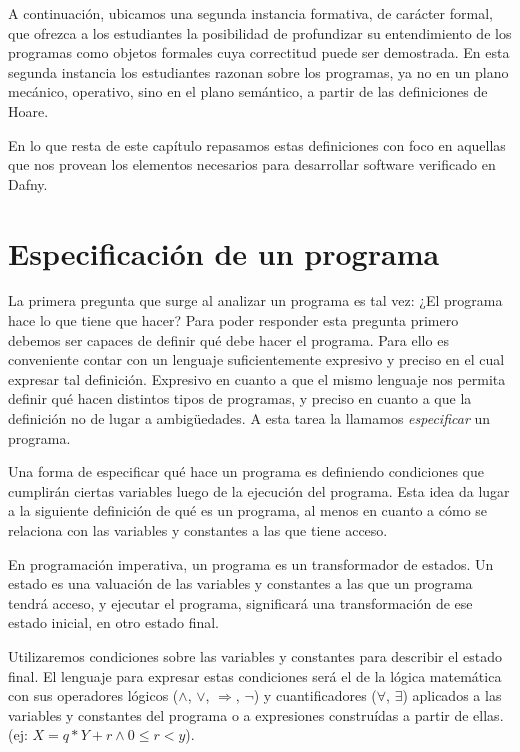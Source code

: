 \documentclass[12pt, a4paper, openany, fleqn]{book}
\begin{document}
    A continuación, ubicamos una segunda instancia formativa, de carácter formal, que ofrezca a los estudiantes la posibilidad de profundizar su entendimiento de los programas como objetos formales cuya correctitud puede ser demostrada.
    En esta segunda instancia los estudiantes razonan sobre los programas, ya no en un plano mecánico, operativo, sino en el plano semántico, a partir de las definiciones de Hoare.

    En lo que resta de este capítulo repasamos estas definiciones con foco en aquellas que nos provean los elementos necesarios para desarrollar software verificado en Dafny.

    \section{Especificación de un programa}
    La primera pregunta que surge al analizar un programa es tal vez: ¿El programa hace lo que tiene que hacer? Para poder responder esta pregunta primero debemos ser capaces de definir qué debe hacer el programa. Para ello es conveniente contar con un lenguaje suficientemente expresivo y preciso en el cual expresar tal definición. Expresivo en cuanto a que el mismo lenguaje nos permita definir qué hacen distintos tipos de programas, y preciso en cuanto a que la definición no de lugar a ambigüedades.
    A esta tarea la llamamos \textit{especificar} un programa.

    Una forma de especificar qué hace un programa es definiendo condiciones que cumplirán ciertas variables luego de la ejecución del programa. Esta idea da lugar a la siguiente definición de qué es un programa, al menos en cuanto a cómo se relaciona con las variables y constantes a las que tiene acceso.

    En programación imperativa, un programa es un transformador de estados. Un estado es una valuación de las variables y constantes a las que un programa tendrá acceso, y ejecutar el programa, significará una transformación de ese estado inicial, en otro estado final.

    Utilizaremos condiciones sobre las variables y constantes para describir el estado final.
    El lenguaje para expresar estas condiciones será el de la lógica matemática con sus operadores lógicos ($\land$, $\lor$, $\Rightarrow$, $\neg$) y cuantificadores ($\forall$, $\exists$) aplicados a las variables y constantes del programa o a expresiones construídas a partir de ellas. (ej: $X = q * Y + r \land 0 \leqslant r < y$).
\end{document}

